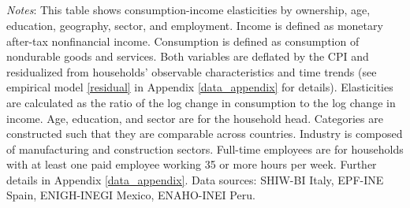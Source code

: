 \documentclass[12pt]{article}
\begin{document}
\begin{spacing}{1.5}
\begin{table}[H]
\begin{centering}
{\begin{tabular}
 \vspace{.3em} \\

\vspace{-.9em} \\
 \vspace{.0em} \\

\vspace{-.9em} \\
 \vspace{.3em} \\

\vspace{-.9em} \\
 \vspace{.3em} \\

\hline
\vspace{-.9em} \\

\toprule
\end{tabular} } \\

\par\end{centering}
\medskip{}
\raggedright{}\textit{\footnotesize{}Notes}{\footnotesize{}: This table shows consumption-income elasticities by ownership, age, education, geography, sector, and employment. Income is defined as monetary after-tax nonfinancial income. Consumption is defined as consumption of nondurable goods and services. Both variables are deflated by the CPI and residualized from households' observable characteristics and time trends (see empirical model \eqref{residual} in Appendix \ref{data_appendix} for details). Elasticities are calculated as the ratio of the log change in consumption to the log change in income. Age, education, and sector are for the household head. Categories are constructed such that they are comparable across countries. Industry is composed of manufacturing and construction sectors.  Full-time employees are for households with at least one paid employee working 35 or more hours per week.  Further details in Appendix \ref{data_appendix}. Data sources: SHIW-BI Italy, EPF-INE Spain, ENIGH-INEGI Mexico, ENAHO-INEI Peru.}{\footnotesize\par}
\end{table}



\end{spacing}
\end{document}
